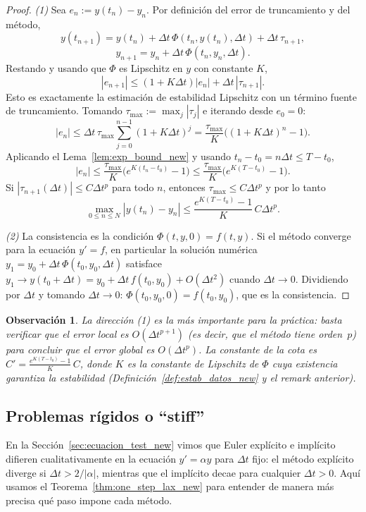 \documentclass[a4paper,11pt]{report}
\newtheorem{remark}[theorem]{Observación}
\begin{document}
\begin{proof}
\textit{(1)} Sea $e_n:=y(t_n)-y_n$. Por definición del error de truncamiento y del método,
\[
  y(t_{n+1})=y(t_n)+\Delta t\,\Phi(t_n,y(t_n),\Delta t)+\Delta t\,\tau_{n+1},
\]
\[
  y_{n+1}=y_n+\Delta t\,\Phi(t_n,y_n,\Delta t).
\]
Restando y usando que $\Phi$ es Lipschitz en $y$ con constante $K$,
\[
  |e_{n+1}|\le (1+K\Delta t)|e_n|+\Delta t\,|\tau_{n+1}|.
\]
Esto es exactamente la estimación de estabilidad Lipschitz con un término fuente de truncamiento. Tomando $\tau_{\max}:=\max_j|\tau_j|$ e iterando desde $e_0=0$:
\[
  |e_n|\le \Delta t\,\tau_{\max}\sum_{j=0}^{n-1}(1+K\Delta t)^j
  =\frac{\tau_{\max}}{K}\bigl((1+K\Delta t)^n-1\bigr).
\]
Aplicando el Lema~\ref{lem:exp_bound_new} y usando $t_n-t_0=n\Delta t\le T-t_0$,
\[
  |e_n|\le \frac{\tau_{\max}}{K}\bigl(e^{K(t_n-t_0)}-1\bigr)
  \le \frac{\tau_{\max}}{K}\bigl(e^{K(T-t_0)}-1\bigr).
\]
Si $|\tau_{n+1}(\Delta t)|\le C\Delta t^p$ para todo $n$, entonces $\tau_{\max}\le C\Delta t^p$ y por lo tanto
\[
  \max_{0\le n\le N}|y(t_n)-y_n|\le \frac{e^{K(T-t_0)}-1}{K}\,C\Delta t^p.
\]

\textit{(2)} La consistencia es la condición $\Phi(t,y,0)=f(t,y)$. Si el método converge para la ecuación $y'=f$, en particular la solución numérica $y_1=y_0+\Delta t\,\Phi(t_0,y_0,\Delta t)$ satisface $y_1\to y(t_0+\Delta t)=y_0+\Delta t\,f(t_0,y_0)+O(\Delta t^2)$ cuando $\Delta t\to0$. Dividiendo por $\Delta t$ y tomando $\Delta t\to0$: $\Phi(t_0,y_0,0)=f(t_0,y_0)$, que es la consistencia.
\end{proof}

\begin{remark}
La dirección (1) es la más importante para la práctica: basta verificar que el error local es $O(\Delta t^{p+1})$ (es decir, que el método tiene orden~$p$) para concluir que el error global es $O(\Delta t^p)$. La constante de la cota es $C' = \frac{e^{K(T-t_0)}-1}{K}\,C$, donde $K$ es la constante de Lipschitz de $\Phi$ cuya existencia garantiza la estabilidad (Definición~\ref{def:estab_datos_new} y el remark anterior).
\end{remark}

\subsection{Problemas rígidos o ``stiff''}\label{sec:stiff_new}

En la Sección~\ref{sec:ecuacion_test_new} vimos que Euler explícito e implícito difieren cualitativamente en la ecuación $y'=\alpha y$ para $\Delta t$ fijo: el método explícito diverge si $\Delta t>2/|\alpha|$, mientras que el implícito decae para cualquier $\Delta t>0$. Aquí usamos el Teorema~\ref{thm:one_step_lax_new} para entender de manera más precisa qué paso impone cada método.
\end{document}
